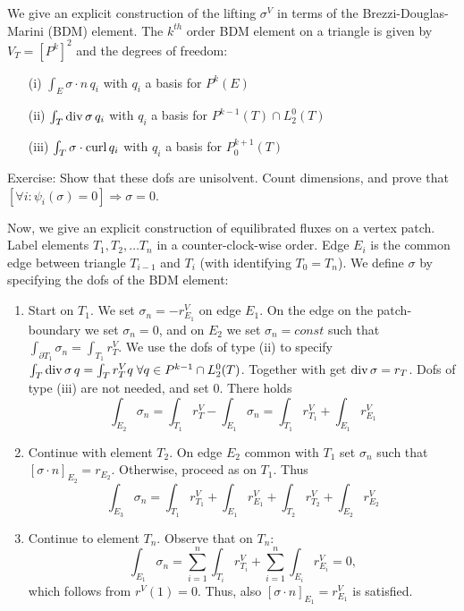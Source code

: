 We give an explicit construction of the lifting $\sigma^V$ in terms of the Brezzi-Douglas-Marini (BDM) element. The $k^{th}$ order BDM element on a triangle is given by $V_T = [P^k]^2$ and the degrees of freedom:
\begin{enumerate}
\item[(i)] $\int_E \sigma\cdot n \, q_i$  with $q_i$ a basis for $ P^k(E)$
\item[(ii)] $\int_T \operatorname{div} \sigma \, q_i$  with $q_i$ a basis for $ P^{k-1}(T) \cap L_2^0(T)$
\item[(iii)] $\int_T \sigma \cdot \operatorname{curl} q_i$  with $q_i$ a basis for $ P_0^{k+1}(T)$
\end{enumerate}
Exercise: Show that these dofs are unisolvent. Count dimensions, and prove that $[ \forall i: \psi_i(\sigma) =0 ] \Rightarrow \sigma = 0$.


Now, we give an explicit construction of equilibrated fluxes on a vertex patch. Label elements $T_1, T_2, \ldots T_n$ in a counter-clock-wise order. Edge $E_i$ is the  common edge between triangle $T_{i-1}$ and $T_i$ (with identifying $T_0 = T_n$). We define $\sigma$ by specifying the dofs of the BDM element:
\begin{enumerate}
\item
Start on $T_1$. We set $\sigma_n = -r^V_{E_1}$ on edge $E_1$. On the edge on the patch-boundary we set $\sigma_n = 0$, and on $E_2$ we set $\sigma_n = const$ such that $\int_{\partial T_1} \sigma_n = \int_{T_1} r^V_T$. We use the dofs of type (ii) to specify 
$\int_T \operatorname{div} \sigma \, q = \int_T r_T^V q \; \forall q \in P^{k-1} \cap L_2^0(T)$. Together with get $\operatorname{div} \sigma = r_T$. Dofs of type (iii) are not needed, and set 0. There holds
$$
\int_{E_2} \sigma_n = \int_{T_1} r^V_T - \int_{E_1} \sigma_n = \int_{T_1} r^V_{T_1} + \int_{E_1} r^V_{E_1}
$$
\item Continue with element $T_2$. On edge $E_2$ common with $T_1$ set $\sigma_n$ such that $[\sigma \cdot n]_{E_2} = r_{E_2}$. Otherwise, proceed as on $T_1$. Thus
$$
\int_{E_3} \sigma_n = \int_{T_1} r^V_{T_1} + \int_{E_1} r^V_{E_1} +\int_{T_2} r^V_{T_2} + \int_{E_2} r^V_{E_2} 
$$
\item Continue to element $T_n$. Observe that on $T_n$:
$$
\int_{E_1} \sigma_n = \sum_{i=1}^n \int_{T_i} r^V_{T_i} + \sum_{i=1}^n \int_{E_i} r^V_{E_i} = 0,
$$
which follows from $r^V(1) = 0$. Thus, also $[\sigma \cdot n]_{E_1} = r_{E_1}^V$ is satisfied.
\end{enumerate}


